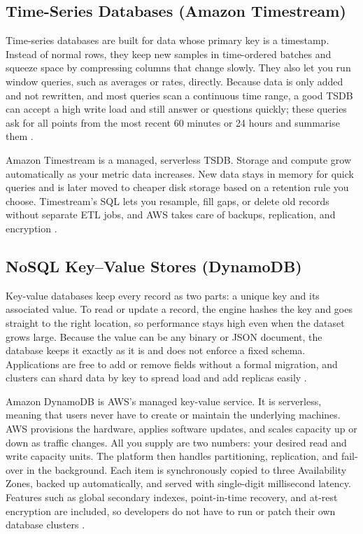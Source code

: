 \documentclass[nomenclature, english, biblatex]{kththesis}
\numberwithin{listing}{chapter}
\begin{document}
\subsection{Time-Series Databases (Amazon Timestream)}
Time-series databases are built for data whose primary key is a timestamp. Instead of normal rows, they keep new samples in time-ordered batches and squeeze space by compressing columns that change slowly. They also let you run window queries, such as averages or rates, directly. Because data is only added and not rewritten, and most queries scan a continuous time range, a good TSDB can accept a high write load and still answer  or  questions quickly; these queries ask for all points from the most recent 60 minutes or 24 hours and summarise them \cite[Chs.~3 \& 11]{Kleppmann2017DDIA}.

Amazon Timestream is a managed, serverless \gls{TSDB}. Storage and compute grow automatically as your metric data increases. New data stays in memory for quick queries and is later moved to cheaper disk storage based on a retention rule you choose. Timestream's SQL lets you resample, fill gaps, or delete old records without separate \gls{ETL} jobs, and AWS takes care of backups, replication, and encryption \cite{AWSTimestreamDoc}.


\subsection{NoSQL Key–Value Stores (DynamoDB)}
Key-value databases keep every record as two parts: a unique key and its associated value.
To read or update a record, the engine hashes the key and goes straight to the right location, so performance stays high even when the dataset grows large.
Because the value can be any binary or JSON document, the database keeps it exactly as it is and does not enforce a fixed schema.
Applications are free to add or remove fields without a formal migration, and clusters can shard data by key to spread load and add replicas easily \cite[Chs.~2 \& 8]{Sadalage2013NoSQLDistilled}.

Amazon DynamoDB is AWS's managed key-value service.
It is serverless, meaning that users never have to create or maintain the underlying machines.
AWS provisions the hardware, applies software updates, and scales capacity up or down as traffic changes.
All you supply are two numbers: your desired read and write capacity units. 
The platform then handles partitioning, replication, and fail-over in the background.
Each item is synchronously copied to three Availability Zones, backed up automatically, and served with single-digit millisecond latency.
Features such as global secondary indexes, point-in-time recovery, and at-rest encryption are included, so developers do not have to run or patch their own database clusters \cite{AWSDynamoDBDoc}.
\end{document}

